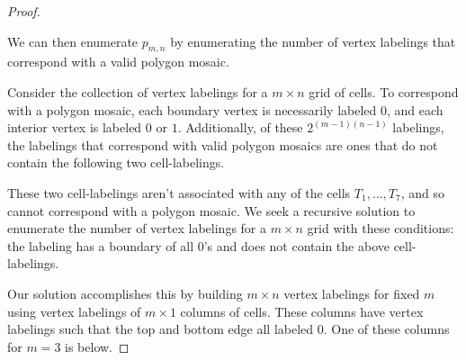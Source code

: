 \documentclass[12pt]{article}
\theoremstyle{plain}
\theoremstyle{definition}
\theoremstyle{remark}
\theoremstyle{definition}
\newcommand{\cell}[4]{ \draw[thick] ( #1 , #2 ) rectangle ( #3 , #4 );}
\newcommand{\lablvertex}[3]{\node[shape=circle,draw=none,fill=white, inner sep=2pt,minimum size=5pt] (A) at ( #1 , #2 ) {#3};}
\begin{document}
\begin{proof}
\begin{center}
\end{center}

We can then enumerate $p_{m,n}$ by enumerating the number of vertex labelings that correspond with a valid polygon mosaic. 

Consider the collection of vertex labelings for a $m \times n$ grid of cells. To correspond with a polygon mosaic, each boundary vertex is necessarily labeled $0$, and each interior vertex is labeled $0$ or $1$. Additionally, of these $2^{(m-1)(n-1)}$ labelings, the labelings that correspond with valid polygon mosaics are ones that do not contain the following two cell-labelings.

\begin{center}
\end{center}

These two cell-labelings aren't associated with any of the cells $T_1, \dots, T_7$, and so cannot correspond with a polygon mosaic. We seek a recursive solution to enumerate the number of vertex labelings for a $m \times n$ grid with these  conditions: the labeling has a boundary of all $0$'s and does not contain the above cell-labelings. 

Our solution accomplishes this by building $m \times n$ vertex labelings for fixed $m$ using vertex labelings of $m \times 1$ columns of cells. These columns have vertex labelings such that the top and bottom edge all labeled $0$. One of these columns for $m=3$ is below.


\end{proof}
\end{document}
